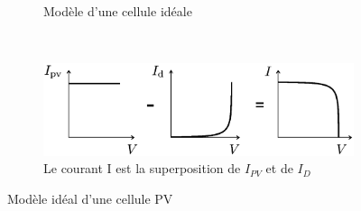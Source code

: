 \begin{figure}[t!]
  \centering
  \begin{subfigure}[b]{0.3\textwidth}
      \centering
      \shorthandoff{:!}
      \shorthandon{:!}
      \caption{Modèle d'une cellule idéale}

  \end{subfigure}
  ~
  \begin{subfigure}[b]{0.65\textwidth}
      \centering
      \includegraphics[width=\textwidth]{resources/superp.png}
      \caption{Le courant I est la superposition de $I_{PV}$ et de $I_D$ \cite{Villalva2009}}
  \end{subfigure}
  \caption{Modèle idéal d'une cellule PV}
  \label{fig:idealcell}
\end{figure}


